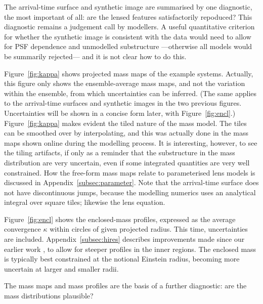 The arrival-time surface and synthetic image are summarised by one
diagnostic, the most important of all: are the lensed features
satisfactorily repoduced?  This diagnostic remains a judgement call by
modellers.  A useful quantitative criterion for whether the synthetic
image is consistent with the data would need to allow for PSF
dependence and unmodelled substructure ---otherwise all models would
be summarily rejected--- and it is not clear how to do this.

Figure~\ref{fig:kappa} shows projected mass maps of the example
systems.  Actually, this figure only shows the ensemble-average mass
maps, and not the variation within the ensemble, from which
uncertainties can be inferred.  (The same applies to the arrival-time
surfaces and synthetic images in the two previous figures.
Uncertainties will be shown in a concise form later, with
Figure~\ref{fig:encl}.)  Figure~\ref{fig:kappa} makes evident the
tiled nature of the mass model.  The tiles can be smoothed over by
interpolating, and this was actually done in the mass maps shown
online during the modelling process.  It is interesting, however, to
see the tiling artifacts, if only as a reminder that the substructure
in the mass distribution are very uncertain, even if some integrated
quantities are very well constrained.  How the free-form mass maps
relate to parameterised lens models is discussed in
Appendix~\ref{subsec:parameter}.  Note that the arrival-time surface
does not have discontinuous jumps, because the modelling numerics uses
an analytical integral over square tiles; likewise the lens equation.

Figure~\ref{fig:encl} shows the enclosed-mass profiles,
expressed as the average convergence $\kappa$ within circles of given
projected radius.  This time, uncertainties are included.
Appendix~\ref{subsec:hires} describes improvements made since our
earlier work \citep{2015MNRAS.447.2170K}, to allow for steeper
profiles in the inner regions.  The enclosed mass is typically best
constrained at the notional Einstein radius, becoming more uncertain
at larger and smaller radii.

The mass maps and mass profiles are the basis of a further diagnostic:
are the mass distributions plausible?
